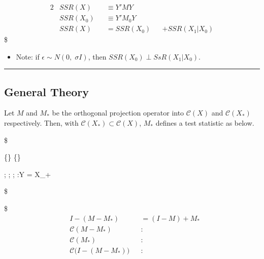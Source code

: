\documentclass[
]{book}
\providecommand{\tightlist}{%
  \setlength{\itemsep}{0pt}\setlength{\parskip}{0pt}}
\begin{document}
{{{\begin{alignat}{2}
&SSR(X) &&\equiv Y ' MY \\

&SSR(X_0) &&\equiv Y ' M_0 Y \\

&SSR(X) &&= SSR(X_0) &&+ SSR (X_1 \vert X_0)

\end{alignat}
\$

\begin{itemize}
\tightlist
\item
  Note: if \(\epsilon \sim N(0, \; \sigma I)\), then \(SSR(X_0) \perp SsR(X_1 \vert X_0)\).
\end{itemize}

\begin{center}\rule{0.5\linewidth}{0.5pt}\end{center}

\hypertarget{general-theory}{%
\subsection{General Theory}\label{general-theory}}

Let \(M\) and \(M_\ast\) be the orthogonal projection operator into \(\mathcal{C}(X)\) and \(\mathcal{C}(X_\ast)\) respectively. Then, with \(\mathcal{C}(X_\ast) \subset \mathcal{C}(X)\), \(M_\ast\) defines a test statistic as below.

\$

\dfrac

\{\}
\{\}

; ; ; :Y = X\_\ast \gamma + \epsilon

\$

\$
\begin{align}

&I-(M-M_\ast ) &&= (I-M) + M_\ast

\\

&\mathcal{C}(M-M_\ast) &&:\tag{Estimation Space, under H0}

\\

&\mathcal{C}(M_\ast)  &&:\tag{Test Space, under H0}

\\


&\mathcal{C} \Big(I - (M-M_\ast)\Big)  &&:\tag{Error Space, under H0}





\end{align}

}}}
\end{document}
